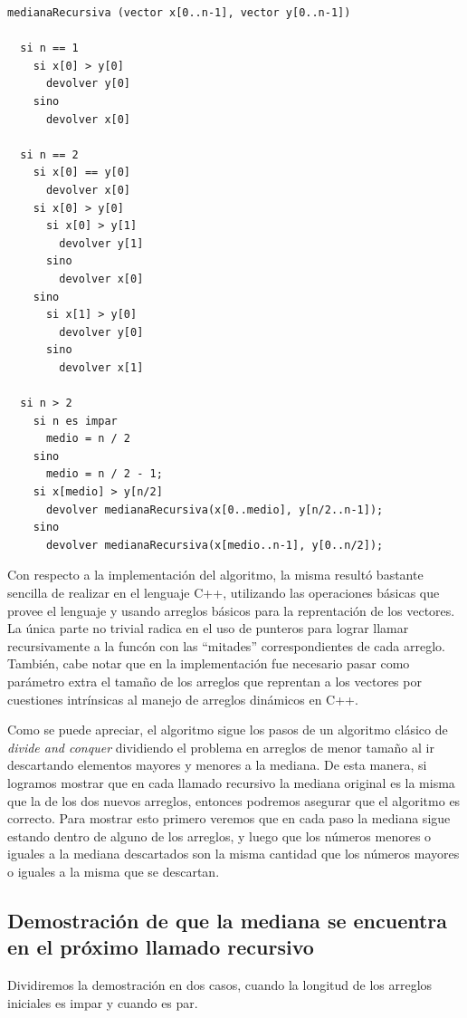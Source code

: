 \documentclass[a4paper,11pt] {article}
\begin{document}
\begin{verbatim}
medianaRecursiva (vector x[0..n-1], vector y[0..n-1])

  si n == 1
    si x[0] > y[0]
      devolver y[0]
    sino
      devolver x[0]

  si n == 2
    si x[0] == y[0]
      devolver x[0]
    si x[0] > y[0]
      si x[0] > y[1]
        devolver y[1]
      sino
        devolver x[0]
    sino
      si x[1] > y[0]
        devolver y[0]
      sino
        devolver x[1]

  si n > 2
    si n es impar
      medio = n / 2
    sino
      medio = n / 2 - 1;
    si x[medio] > y[n/2]
      devolver medianaRecursiva(x[0..medio], y[n/2..n-1]);
    sino
      devolver medianaRecursiva(x[medio..n-1], y[0..n/2]);
\end{verbatim}

Con respecto a la implementaci\'on del algoritmo, la misma result\'o bastante sencilla de realizar en el lenguaje C++, utilizando las operaciones b\'asicas que provee el lenguaje y usando arreglos b\'asicos para la reprentaci\'on de los vectores. La \'unica parte no trivial radica en el uso de punteros para lograr llamar recursivamente a la func\'on con las ``mitades'' correspondientes de cada arreglo. Tambi\'en, cabe notar que en la implementaci\'on fue necesario pasar como par\'ametro extra el tama\~{n}o de los arreglos que reprentan a los vectores por cuestiones intr\'insicas al manejo de arreglos din\'amicos en C++.

Como se puede apreciar, el algoritmo sigue los pasos de un algoritmo cl\'asico de \textit{divide and conquer} dividiendo el problema en arreglos de menor tama\~{n}o al ir descartando elementos mayores y menores a la mediana. De esta manera, si logramos mostrar que en cada llamado recursivo la mediana original es la misma que la de los dos nuevos arreglos, entonces podremos asegurar que el algoritmo es correcto. Para mostrar esto primero veremos que en cada paso la mediana sigue estando dentro de alguno de los arreglos, y luego que los n\'umeros menores o iguales a la mediana descartados son la misma cantidad que los n\'umeros mayores o iguales a la misma que se descartan.

\subsection*{Demostraci\'on de que la mediana se encuentra en el pr\'oximo llamado recursivo}

Dividiremos la demostraci\'on en dos casos, cuando la longitud de los arreglos iniciales es impar y cuando es par.
\end{document}
